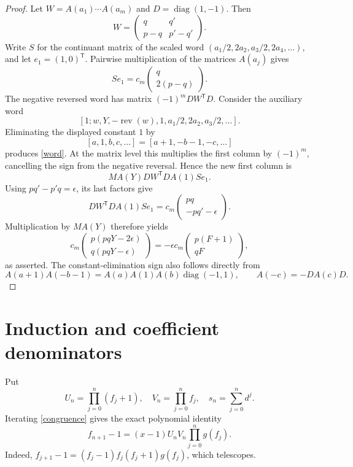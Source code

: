 \documentclass[11pt]{article}
\newcommand{\rev}{\operatorname{rev}}
\begin{document}
\begin{proof}
Let $W=A(a_1)\cdots A(a_m)$ and $D=\operatorname{diag}(1,-1)$.
Then
\[
 W=\begin{pmatrix}q&q'\\p-q&p'-q'\end{pmatrix}.
\]
Write $S$ for the continuant matrix of the scaled word
$(a_1/2,2a_2,a_3/2,2a_4,\ldots)$, and let $e_1=(1,0)^{\mathsf T}$.
Pairwise multiplication of the matrices $A(a_j)$ gives
\[
 Se_1=c_m\begin{pmatrix}q\\2(p-q)\end{pmatrix}.
\]
The negative reversed word has matrix $(-1)^mDW^{\mathsf T}D$.
Consider the auxiliary word
\[
 [1;w,Y,-\rev(w),1,a_1/2,2a_2,a_3/2,\ldots].
\]
Eliminating the displayed constant $1$ by
\[
 [a,1,b,c,\ldots]=[a+1,-b-1,-c,\ldots]
\]
produces \eqref{word}. At the matrix level this multiplies the first
column by $(-1)^m$, cancelling the sign from the negative reversal.
Hence the new first column is
\[
 M A(Y) D W^{\mathsf T}D A(1)S e_1.
\]
Using $pq'-p'q=\epsilon$, its last factors give
\[
 DW^{\mathsf T}DA(1)Se_1
   =c_m\begin{pmatrix}pq\\-pq'-\epsilon\end{pmatrix}.
\]
Multiplication by $MA(Y)$ therefore yields
\[
 c_m\begin{pmatrix}p(pqY-2\epsilon)\\q(pqY-\epsilon)\end{pmatrix}
 =-\epsilon c_m\begin{pmatrix}p(F+1)\\qF\end{pmatrix},
\]
as asserted. The constant-elimination sign also follows directly from
\[
 A(a+1)A(-b-1)=A(a)A(1)A(b)\operatorname{diag}(-1,1),
 \qquad A(-c)=-DA(c)D.
\]
\end{proof}

\section*{Induction and coefficient denominators}
Put
\[
 U_n=\prod_{j=0}^n(f_j+1),\quad V_n=\prod_{j=0}^nf_j,
 \quad s_n=\sum_{j=0}^nd^j.
\]
Iterating \eqref{congruence} gives the exact polynomial identity
\begin{equation}\label{divisibility}
 f_{n+1}-1=(x-1)U_nV_n\prod_{j=0}^ng(f_j).
\end{equation}
Indeed, $f_{j+1}-1=(f_j-1)f_j(f_j+1)g(f_j)$, which telescopes.
\end{document}
